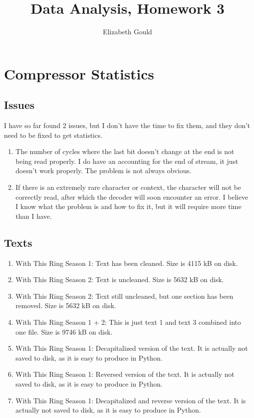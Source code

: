 \documentclass{article}
\title{Data Analysis, Homework 3}
\author{Elizabeth Gould}
\begin{document}
\maketitle

\section{Compressor Statistics}

\subsection{Issues}

I have so far found 2 issues, but I don't have the time to fix them, and they don't need to be fixed to get statistics.
\begin{enumerate}
\item The number of cycles where the last bit doesn't change at the end is not being read properly. I do have an accounting for the end of stream, it just doesn't work properly. The problem is not always obvious. 
\item If there is an extremely rare character or context, the character will not be correctly read, after which the decoder will soon encounter an error. I believe I know what the problem is and how to fix it, but it will require more time than I have.
\end{enumerate}

\subsection{Texts} 

\begin{enumerate}
\item With This Ring Season 1: Text has been cleaned. Size is 4115 kB on disk. 
\item With This Ring Season 2: Text is uncleaned. Size is 5632 kB on disk.
\item With This Ring Season 2: Text still uncleaned, but one section has been removed. Size is 5632 kB on disk.
\item With This Ring Season 1 + 2: This is just text 1 and text 3 combined into one file. Size is 9746 kB on disk.
\item With This Ring Season 1: Decapitalized version of the text. It is actually not saved to disk, as it is easy to produce in Python.
\item With This Ring Season 1: Reversed version of the text. It is actually not saved to disk, as it is easy to produce in Python.
\item With This Ring Season 1: Decapitalized and reverse version of the text. It is actually not saved to disk, as it is easy to produce in Python.


\end{enumerate}
\end{document}
